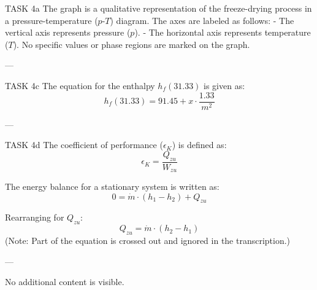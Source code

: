 TASK 4a  
The graph is a qualitative representation of the freeze-drying process in a pressure-temperature (\( p \)-\( T \)) diagram. The axes are labeled as follows:  
- The vertical axis represents pressure (\( p \)).  
- The horizontal axis represents temperature (\( T \)).  
No specific values or phase regions are marked on the graph.

---

TASK 4c  
The equation for the enthalpy \( h_f(31.33) \) is given as:  
\[
h_f(31.33) = 91.45 + x \cdot \frac{1.33}{m^2}
\]

---

TASK 4d  
The coefficient of performance (\( \epsilon_K \)) is defined as:  
\[
\epsilon_K = \frac{Q_{zu}}{W_{zu}}
\]

The energy balance for a stationary system is written as:  
\[
0 = \dot{m} \cdot (h_1 - h_2) + Q_{zu}
\]

Rearranging for \( Q_{zu} \):  
\[
Q_{zu} = \dot{m} \cdot (h_2 - h_1)
\]  
(Note: Part of the equation is crossed out and ignored in the transcription.)

---

No additional content is visible.